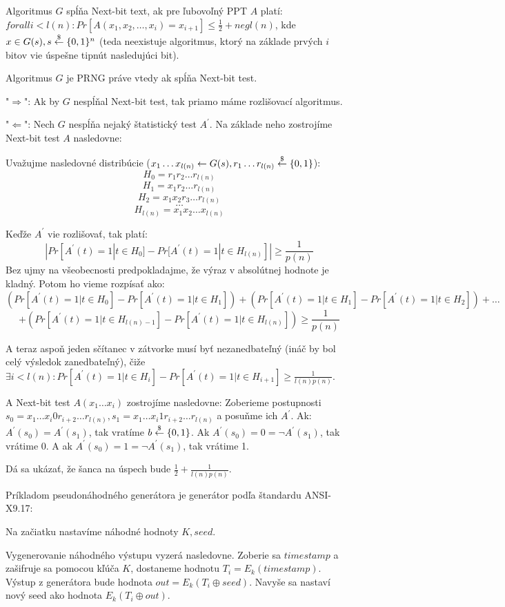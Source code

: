 \begin{definicia}
Algoritmus $G$ spĺňa Next-bit text, ak pre ľubovoľný PPT $A$ platí:
$forall i < l(n)\colon Pr[A(x_1, x_2, \dots, x_i) = x_{i+1}] \leq \frac{1}{2} + negl(n)$, kde
$x \in G(s), s \overset{\$}{\leftarrow} \{0,1\}^n$ (teda neexistuje algoritmus, ktorý na základe
prvých $i$ bitov vie úspešne tipnút nasledujúci bit).
\end{definicia}

\begin{veta}
Algoritmus $G$ je PRNG práve vtedy ak spĺňa Next-bit test.
\end{veta}

\begin{dokaz}
"$\Rightarrow$": Ak by $G$ nespĺňal Next-bit test, tak priamo máme rozlišovací algoritmus.

"$\Leftarrow$": Nech $G$ nespĺňa nejaký štatistický test $A^{'}$. Na základe neho zostrojíme Next-bit
test $A$ nasledovne:

Uvažujme nasledovné distribúcie ($x_1 \dots x_{l(n)} \leftarrow G(s), r_1 \dots r_{l(n)} \overset{\$}{\leftarrow} \{0,1\}$):
$$H_0 = r_1 r_2 \dots r_{l(n)}$$
$$H_1 = x_1 r_2 \dots r_{l(n)}$$
$$H_2 = x_1 x_2 r_3 \dots r_{l(n)}$$
$$\dots$$
$$H_{l(n)} = x_1 x_2 \dots x_{l(n)}$$

Keďže $A^{'}$ vie rozlišovať, tak platí:
$$|Pr[A^{'}(t) = 1 | t \in H_0] - Pr[A^{'}(t) = 1 | t \in H_{l(n)}]| \geq \frac{1}{p(n)}$$
Bez ujmy na všeobecnosti predpokladajme, že výraz v absolútnej hodnote je kladný.
Potom ho vieme rozpísať ako:
$$(Pr[A^{'}(t) = 1 | t \in H_0] - Pr[A^{'}(t) = 1 | t \in H_{1}]) + (Pr[A^{'}(t) = 1 | t \in H_1] - Pr[A^{'}(t) = 1 | t \in H_{2}])
+ \dots $$ $$+ (Pr[A^{'}(t) = 1 | t \in H_{l(n)-1}] - Pr[A^{'}(t) = 1 | t \in H_{l(n)}]) \geq \frac{1}{p(n)}$$

A teraz aspoň jeden sčítanec v zátvorke musí byť nezanedbateľný (ináč by bol celý výsledok zanedbateľný), čiže
$\exists i < l(n)\colon Pr[A^{'}(t) = 1 | t \in H_{i}] - Pr[A^{'}(t) = 1 | t \in H_{i+1}] \geq \frac{1}{l(n)p(n)}$.

A Next-bit test $A(x_1 \dots x_i)$ zostrojíme nasledovne:
Zoberieme postupnosti $s_0 = x_1 \dots x_i 0 r_{i+2} \dots r_{l(n)}, s_1 = x_1 \dots x_i 1 r_{i+2} \dots r_{l(n)}$
a posuňme ich $A^{'}$. Ak:
$A^{'}(s_0) = A^{'}(s_1)$, tak vratíme $b \overset{\$}{\leftarrow} \{0,1\}$. Ak $A^{'}(s_0) = 0 = \neg A^{'}(s_1)$, tak vrátime 0.
A ak $A^{'}(s_0) = 1 = \neg A^{'}(s_1)$, tak vrátime 1.

Dá sa ukázať, že šanca na úspech bude $\frac{1}{2} + \frac{1}{l(n)p(n)}$.
\end{dokaz}

Príkladom pseudonáhodného generátora je generátor podľa štandardu ANSI-X9.17:

Na začiatku nastavíme náhodné hodnoty $K, seed$. 

Vygenerovanie náhodného výstupu vyzerá nasledovne. Zoberie sa $timestamp$ a zašifruje
sa pomocou kľúča $K$, dostaneme hodnotu $T_i = E_k(timestamp)$. Výstup z generátora bude
hodnota $out = E_k(T_i \oplus seed)$. Navyše sa nastaví nový seed ako hodnota $E_k(T_i \oplus out)$.
